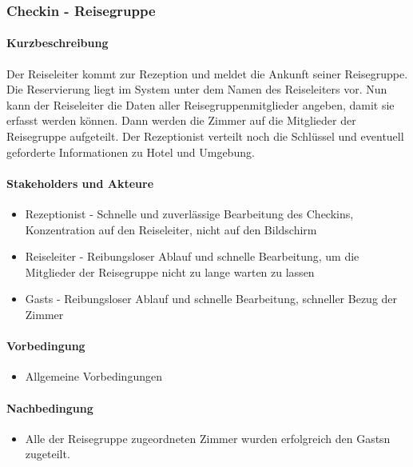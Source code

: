 \subsubsection{Checkin - Reisegruppe}

\paragraph{Kurzbeschreibung}
Der \Gls{Reiseleiter} kommt zur \Gls{Rezeption} und meldet die Ankunft seiner Reisegruppe. Die \Gls{Reservierung} liegt im System unter dem Namen des \Gls{Reiseleiter}s vor. Nun kann der \Gls{Reiseleiter} die Daten aller Reisegruppenmitglieder angeben, damit sie erfasst werden können.
Dann werden die \Gls{Zimmer} auf die Mitglieder der Reisegruppe aufgeteilt. Der \Gls{Rezeptionist} verteilt noch die Schlüssel und eventuell geforderte Informationen zu Hotel und Umgebung.

\paragraph{Stakeholders und Akteure}
\begin{itemize}
	\item \Gls{Rezeptionist} - Schnelle und zuverlässige Bearbeitung des \Gls{Checkin}s, Konzentration auf den  \Gls{Reiseleiter}, nicht auf den Bildschirm
	\item \Gls{Reiseleiter} - Reibungsloser Ablauf und schnelle Bearbeitung, um die Mitglieder der Reisegruppe nicht zu lange warten zu lassen
	\item \Glspl{Gast} - Reibungsloser Ablauf und schnelle Bearbeitung, schneller Bezug der \Gls{Zimmer}
\end{itemize}

\paragraph{Vorbedingung}
\begin{itemize}
	\item Allgemeine Vorbedingungen
\end{itemize}

\paragraph{Nachbedingung}
\begin{itemize}
	\item Alle der Reisegruppe zugeordneten \Gls{Zimmer} wurden erfolgreich den \Glspl{Gast}n zugeteilt.
\end{itemize}

